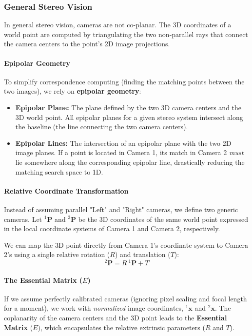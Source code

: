 \subsubsection{General Stereo Vision}
In general stereo vision, cameras are not co-planar. The 3D coordinates of a world point are computed by triangulating the two non-parallel rays that connect the camera centers to the point's 2D image projections.

\paragraph{Epipolar Geometry}
To simplify correspondence computing (finding the matching points between the two images), we rely on \textbf{epipolar geometry}:
\begin{itemize}
    \item \textbf{Epipolar Plane:} The plane defined by the two 3D camera centers and the 3D world point. All epipolar planes for a given stereo system intersect along the baseline (the line connecting the two camera centers).
    \item \textbf{Epipolar Lines:} The intersection of an epipolar plane with the two 2D image planes. If a point is located in Camera 1, its match in Camera 2 \textit{must} lie somewhere along the corresponding epipolar line, drastically reducing the matching search space to 1D.
\end{itemize}

\paragraph{Relative Coordinate Transformation}
Instead of assuming parallel "Left" and "Right" cameras, we define two generic cameras. Let $^1\boldsymbol{P}$ and $^2\boldsymbol{P}$ be the 3D coordinates of the same world point expressed in the local coordinate systems of Camera 1 and Camera 2, respectively. 

We can map the 3D point directly from Camera 1's coordinate system to Camera 2's using a single relative rotation ($R$) and translation ($T$):
\begin{equation}
    ^2\boldsymbol{P} = R \: ^1\boldsymbol{P} + T
    \label{eq:relative_transformation}
\end{equation}

\paragraph{The Essential Matrix ($E$)}
If we assume perfectly calibrated cameras (ignoring pixel scaling and focal length for a moment), we work with \textit{normalized} image coordinates, $^1\boldsymbol{x}$ and $^2\boldsymbol{x}$. The coplanarity of the camera centers and the 3D point leads to the \textbf{Essential Matrix} ($E$), which encapsulates the relative extrinsic parameters ($R$ and $T$).

